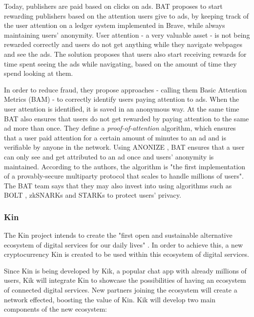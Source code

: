 \medskip

Today, publishers are paid based on clicks on ads. BAT proposes to start rewarding publishers based on the attention users give to ads, by keeping track of the user attention on a ledger system implemented in Brave, while always maintaining users' anonymity. User attention - a very valuable asset - is not being rewarded correctly and users do not get anything while they navigate webpages and see the ads. The solution proposes that users also start receiving rewards for time spent seeing the ads while navigating, based on the amount of time they spend looking at them.

\medskip

In order to reduce fraud, they propose approaches - calling them Basic Attention Metrics (BAM) - to correctly identify users paying attention to ads. When the user attention is identified, it is saved in an anonymous way. At the same time BAT also ensures that users do not get rewarded by paying attention to the same ad more than once. They define a \textit{proof-of-attention} algorithm, which ensures that a user paid attention for a certain amount of minutes to an ad and is verifiable by anyone in the network. Using \textsf{ANONIZE} \cite{ANONIZE}, BAT ensures that a user can only see and get attributed to an ad once and users' anonymity is maintained. According to the authors, the algorithm is "the first implementation of a provably-secure multiparty protocol that scales to handle millions of users".  The BAT team says that they may also invest into using algorithms such as BOLT \cite{Bolt}, zkSNARKs \cite{ZKSNARK} and STARKs \cite{STARK} to protect users' privacy.

\subsubsection{Kin}

The Kin project intends to create the "first open and sustainable alternative ecosystem of digital services for our daily lives" \cite{KIN}. In order to achieve this, a new cryptocurrency Kin is created to be used within this ecosystem of digital services.

Since Kin is being developed by Kik, a popular chat app with already millions of users, Kik will integrate Kin to showcase the possibilities of having an ecosystem of connected digital services. New partners joining the ecosystem will create a network effected, boosting the value of Kin. Kik will develop two main components of the new ecosystem:

